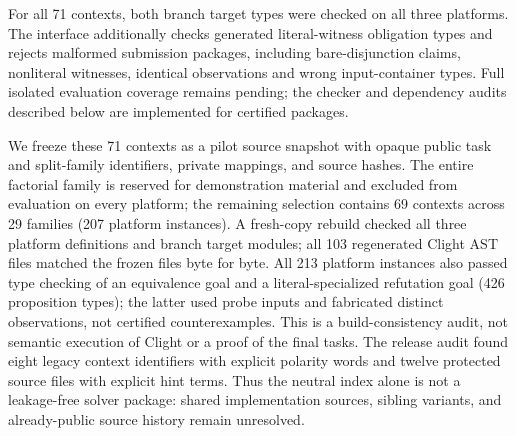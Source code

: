 \documentclass{article}
\begin{document}
For all 71 contexts, both branch target types were checked on all three platforms. The interface additionally checks generated literal-witness obligation types and rejects malformed submission packages, including bare-disjunction claims, nonliteral witnesses, identical observations and wrong input-container types. Full isolated evaluation coverage remains pending; the checker and dependency audits described below are implemented for certified packages.

We freeze these 71 contexts as a pilot source snapshot with opaque public task and split-family identifiers, private mappings, and source hashes. The entire factorial family is reserved for demonstration material and excluded from evaluation on every platform; the remaining selection contains 69 contexts across 29 families (207 platform instances). A fresh-copy rebuild checked all three platform definitions and branch target modules; all 103 regenerated Clight AST files matched the frozen files byte for byte. All 213 platform instances also passed type checking of an equivalence goal and a literal-specialized refutation goal (426 proposition types); the latter used probe inputs and fabricated distinct observations, not certified counterexamples. This is a build-consistency audit, not semantic execution of Clight or a proof of the final tasks. The release audit found eight legacy context identifiers with explicit polarity words and twelve protected source files with explicit hint terms. Thus the neutral index alone is not a leakage-free solver package: shared implementation sources, sibling variants, and already-public source history remain unresolved.
\end{document}
